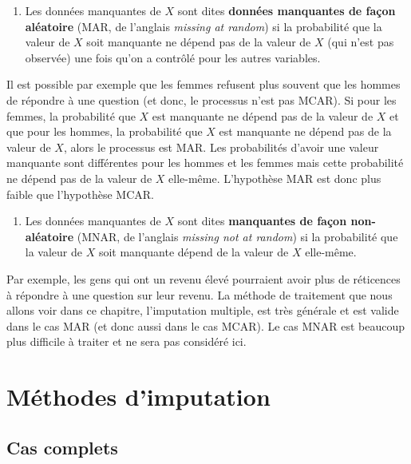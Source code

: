 \documentclass[
  11pt,
  letterpaper,
]{book}
\providecommand{\tightlist}{%
  \setlength{\itemsep}{0pt}\setlength{\parskip}{0pt}}\usepackage{longtable,booktabs,array}
\theoremstyle{definition}
\theoremstyle{remark}
\begin{document}
\begin{enumerate}
\def\labelenumi{\arabic{enumi})}
\setcounter{enumi}{1}
\tightlist
\item
  Les données manquantes de \(X\) sont dites \textbf{données manquantes
  de façon aléatoire} (MAR, de l'anglais \emph{missing at random}) si la
  probabilité que la valeur de \(X\) soit manquante ne dépend pas de la
  valeur de \(X\) (qui n'est pas observée) une fois qu'on a contrôlé
  pour les autres variables.
\end{enumerate}

Il est possible par exemple que les femmes refusent plus souvent que les
hommes de répondre à une question (et donc, le processus n'est pas
MCAR). Si pour les femmes, la probabilité que \(X\) est manquante ne
dépend pas de la valeur de \(X\) et que pour les hommes, la probabilité
que \(X\) est manquante ne dépend pas de la valeur de \(X\), alors le
processus est MAR. Les probabilités d'avoir une valeur manquante sont
différentes pour les hommes et les femmes mais cette probabilité ne
dépend pas de la valeur de \(X\) elle-même. L'hypothèse MAR est donc
plus faible que l'hypothèse MCAR.

\begin{enumerate}
\def\labelenumi{\arabic{enumi})}
\setcounter{enumi}{2}
\tightlist
\item
  Les données manquantes de \(X\) sont dites \textbf{manquantes de façon
  non-aléatoire} (MNAR, de l'anglais \emph{missing not at random}) si la
  probabilité que la valeur de \(X\) soit manquante dépend de la valeur
  de \(X\) elle-même.
\end{enumerate}

Par exemple, les gens qui ont un revenu élevé pourraient avoir plus de
réticences à répondre à une question sur leur revenu. La méthode de
traitement que nous allons voir dans ce chapitre, l'imputation multiple,
est très générale et est valide dans le cas MAR (et donc aussi dans le
cas MCAR). Le cas MNAR est beaucoup plus difficile à traiter et ne sera
pas considéré ici.

\hypertarget{muxe9thodes-dimputation}{%
\section{Méthodes d'imputation}\label{muxe9thodes-dimputation}}

\hypertarget{cas-complets}{%
\subsection{Cas complets}\label{cas-complets}}
\end{document}
